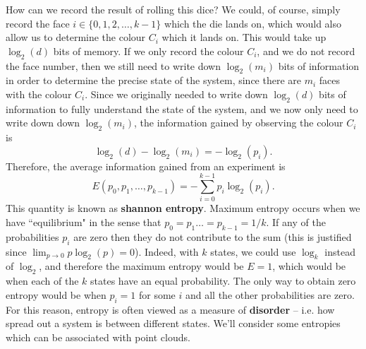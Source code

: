 \documentclass[a4paper,11pt,twoside]{article}
\theoremstyle{definition}
\theoremstyle{remark}
\begin{document}
How can we record the result of rolling this dice? We could, of course, simply record the face $i\in\{0,1,2,\dots, k-1\}$ which the die lands on, which would also allow us to determine the colour $C_i$ which it lands on. This would take up $\log_2(d)$ bits of memory. If we only record the colour $C_i$, and we do not record the face number, then we still need to write down $\log_2(m_i)$ bits of information in order to determine the precise state of the system, since there are $m_i$ faces with the colour $C_i$. Since we originally needed to write down $\log_2(d)$ bits of information to fully understand the state of the system, and we now only need to write down down $\log_2(m_i)$, the information gained by observing the colour $C_i$ is
\begin{displaymath}
\log_2(d)-\log_2(m_i)=-\log_2(p_i).
\end{displaymath}
Therefore, the average information gained from an experiment is
\begin{displaymath}
E(p_0,p_1,\dots, p_{k-1})=-\sum^{k-1}_{i=0}p_i\log_2(p_i).
\end{displaymath}
This quantity is known as \textbf{shannon entropy}. Maximum entropy occurs when we have ``equilibrium" in the sense that $p_0=p_1\dots=p_{k-1}=1/k$. If any of the probabilities $p_i$ are zero then they do not contribute to the sum (this is justified since $\lim_{p\to 0}p\log_2(p)=0$). Indeed, with $k$ states, we could use $\log_k$ instead of $\log_2$, and therefore the maximum entropy would be $E=1$, which would be when each of the $k$ states have an equal probability. The only way to obtain zero entropy would be when $p_i=1$ for some $i$ and all the other probabilities are zero. For this reason, entropy is often viewed as a measure of \textbf{disorder} -- i.e. how spread out a system is between different states. We'll consider some entropies which can be associated with point clouds.
\end{document}
